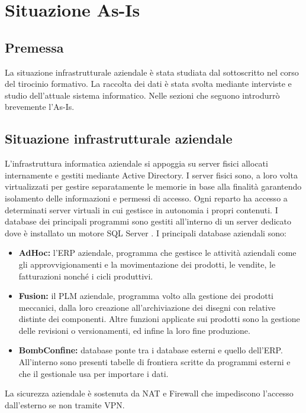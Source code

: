 \chapter{Situazione As-Is}
\label{chap:AsIs}
\section{Premessa}
La situazione infrastrutturale aziendale è stata studiata dal sottoscritto nel corso del tirocinio formativo.
La raccolta dei dati è stata svolta mediante interviste e studio dell'attuale sistema informatico.
Nelle sezioni che seguono introdurrò brevemente l'As-Is.

\section{Situazione infrastrutturale aziendale}
L'infrastruttura informatica aziendale si appoggia su server fisici allocati internamente e gestiti mediante Active Directory.
I server fisici sono, a loro volta virtualizzati per gestire separatamente le memorie in base alla finalità
garantendo isolamento delle informazioni e permessi di accesso.
Ogni reparto ha accesso a determinati server virtuali in cui gestisce in autonomia i propri contenuti.
I database dei principali programmi sono gestiti all'interno di un server dedicato dove è installato un motore 
SQL Server \cite{SQLServer}.
I principali database aziendali sono:
\begin{itemize}
    \item \textbf{Ad\-Hoc\cite{Ad-Hoc}:} l'\ac{ERP} aziendale, programma che gestisce le attività aziendali come gli approvvigionamenti e la movimentazione dei prodotti, 
    le vendite, le fatturazioni nonché i cicli produttivi.
    \item \textbf{Fusion\cite{Fusion}:} il \ac{PLM} aziendale, programma volto alla gestione dei prodotti meccanici, dalla loro creazione
    all'archiviazione dei disegni con relative distinte dei componenti.
    Altre funzioni applicate sui prodotti sono la gestione delle revisioni o versionamenti, ed infine la loro fine produzione.
    \item \textbf{BombConfine:} database ponte tra i database esterni e quello dell'\ac{ERP}. All'interno sono presenti tabelle
    di frontiera scritte da programmi esterni e che il gestionale usa per importare i dati.
\end{itemize}
La sicurezza aziendale è sostenuta da \ac{NAT} e Firewall che impediscono l'accesso dall'esterno se non tramite \ac{VPN}. %

